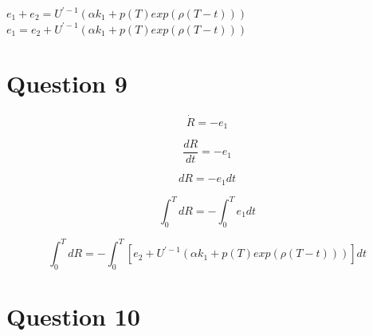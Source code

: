 \documentclass[12pt]{article}
\numberwithin{equation}{subsection} %
\begin{document}
$e_{1}+e_{2}=U^{\prime-1}(\alpha k_{1}+p(T)exp(\rho(T-t)))$\\

$e_{1}=e_{2}+U^{\prime-1}(\alpha k_{1}+p(T)exp(\rho(T-t)))$\\

\section{Question 9}

\begin{equation}
\dot{R}=-e_{1}
\end{equation}


\begin{equation}
\frac{d R}{dt}=-e_{1}
\end{equation}


\begin{equation}
{d R}=-e_{1}dt
\end{equation}


\begin{equation}
\int_{0}^{T}{d R}=-\int_{0}^{T}e_{1}dt
\end{equation}

\begin{equation}
\int_{0}^{T}{d R}=-\int_{0}^{T}\left[ e_{2}+U^{\prime-1}(\alpha k_{1}+p(T)exp(\rho(T-t))) \right]dt
\end{equation}



\section{Question 10}
\vspace{100mm}
\newpage
\end{document}
